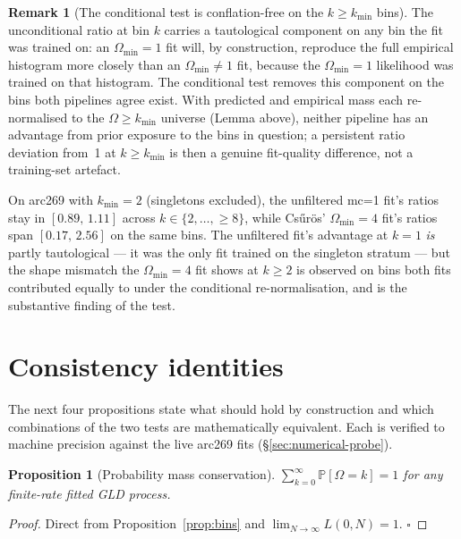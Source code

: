 \documentclass[11pt]{article}
\newcommand{\PROB}{\mathbb{P}}
\newcommand{\1}{\mathbf{1}}
\newcommand{\Om}{\Omega}
\newtheorem{proposition}[theorem]{Proposition}
\theoremstyle{definition}
\newtheorem{remark}[theorem]{Remark}
\begin{document}
\begin{remark}[The conditional test is conflation-free on the
$k\ge k_{\min}$ bins]
\label{rem:no-conflation}
The unconditional ratio at bin $k$ carries a tautological component
on any bin the fit was trained on: an $\Om_{\min}=1$ fit will, by
construction, reproduce the full empirical histogram more closely
than an $\Om_{\min}\ne 1$ fit, because the $\Om_{\min}=1$ likelihood
was trained on that histogram. The conditional test removes this
component on the bins both pipelines agree exist. With predicted
and empirical mass each re-normalised to the $\Om\ge k_{\min}$
universe (Lemma above), neither pipeline has an advantage from
prior exposure to the bins in question; a persistent ratio
deviation from~1 at $k \ge k_{\min}$ is then a genuine fit-quality
difference, not a training-set artefact.

On arc269 with $k_{\min}=2$ (singletons excluded), the unfiltered
mc{=}1 fit's ratios stay in $[0.89,\,1.11]$ across
$k\in\{2,\dots,\ge 8\}$, while Cs\H{u}r\"os' $\Om_{\min}=4$ fit's
ratios span $[0.17,\,2.56]$ on the same bins. The unfiltered fit's
advantage at $k=1$ \emph{is} partly tautological --- it was the
only fit trained on the singleton stratum --- but the shape
mismatch the $\Om_{\min}=4$ fit shows at $k\ge 2$ is observed on
bins both fits contributed equally to under the conditional
re-normalisation, and is the substantive finding of the test.
\end{remark}

\section{Consistency identities}
\label{sec:identities}

The next four propositions state what should hold by construction
and which combinations of the two tests are mathematically
equivalent. Each is verified to machine precision against the live
arc269 fits (\S\ref{sec:numerical-probe}).

\begin{proposition}[Probability mass conservation]
$\sum_{k=0}^\infty \PROB[\Om = k] = 1$ for any finite-rate fitted
GLD process.
\end{proposition}
\begin{proof}
Direct from Proposition~\ref{prop:bins} and
$\lim_{N\to\infty} L(0, N) = 1$. $\square$
\end{proof}
\end{document}
